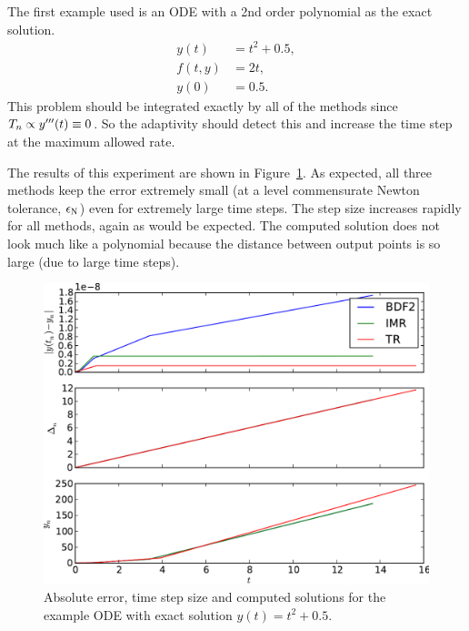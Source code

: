 The first example used is an ODE with a 2nd order polynomial as the exact solution.
\begin{equation}
  \label{eqn:imr-test-poly2}
  \begin{aligned}
    y(t) &= t^2 + 0.5, \\
    f(t,y) &= 2t, \\
    y(0) & = 0.5.
  \end{aligned}
\end{equation}
This problem should be integrated exactly by all of the methods since $T_n \propto y'''(t) \equiv 0$.
So the adaptivity should detect this and increase the time step at the maximum allowed rate.

The results of this experiment are shown in Figure~\ref{fig:imr-poly2-example}. 
As expected, all three methods keep the error extremely small (at a level commensurate Newton tolerance, $\epsilon_{\text{N}}$) even for extremely large time steps.
The step size increases rapidly for all methods, again as would be expected.
The computed solution does not look much like a polynomial because the distance between output points is so large (due to large time steps).

\begin{figure}[\figpos]
  \centering
  \includegraphics[width=1\textwidth]{plots/aimr_odes/poly2-errornormsvs-dtsvs-tracevaluesvstimes}
  \caption{Absolute error, time step size and computed solutions for the example ODE with exact solution $y(t) = t^2 + 0.5$.}
  \label{fig:imr-poly2-example}
\end{figure}


